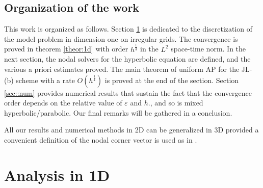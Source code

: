 \documentclass[a4paper,french,english,10pt]{article}
\newcommand\eps{\varepsilon}
\begin{document}

\subsection{Organization of the work}

This work is organized as follows.
Section \ref{sec:2}
is dedicated to the discretization 
of the model problem in dimension one on irregular grids.
The convergence is proved in 
theorem \ref{theor:1d}
with order
$h^{\frac13}$ in the $L^2$ space-time norm.
In the next section, the nodal solvers for the hyperbolic equation are defined, and the various a priori
estimates proved. 
The main theorem of uniform AP for the JL-(b) scheme
with a rate $O(h^\frac14)$
is proved at the end of the section.
Section \ref{sec::num}
  provides numerical results that sustain the fact
that the convergence order depends on the relative value of $\eps$ and $h$.,
and so is mixed hyperbolic/parabolic. 
Our final remarks will be gathered in a conclusion.

All our results and numerical methods in 2D can be generalized in 3D 
provided a convenient definition of the nodal corner vector is used as in \cite{de10}.
 
\section{Analysis in 1D} \label{sec:2}

\end{document}
